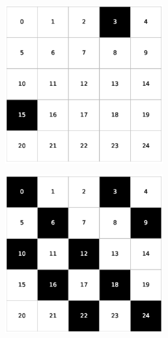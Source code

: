 \begin{figure}[h!]
\begin{subfigure}[b]{\textwidth}
\begin{subfigure}[b]{0.20\textwidth}
        \end{subfigure}
     \end{subfigure}
     \caption{Soluzioni delle istanze Tai16c a densità 30\%, 50\% e 80\%}
     \vspace*{1.5cm}
     \begin{subfigure}[b]{\textwidth}
        \centering
        \begin{subfigure}[b]{0.20\textwidth}
            \includegraphics[width=\columnwidth]{images/Tai25c_5x5_10.eps}
        \end{subfigure}
        \hspace{3em}
        \begin{subfigure}[b]{0.20\textwidth}
            \includegraphics[width=\columnwidth]{images/Tai25c_5x5_40.eps}

\end{subfigure}
\end{subfigure}
\end{figure}
